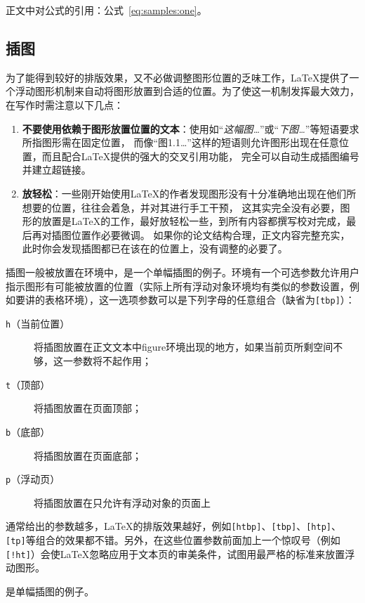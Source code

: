 正文中对公式的引用：公式~\eqref{eq:samples:one}。

\subsection{插图}
为了能得到较好的排版效果，又不必做调整图形位置的乏味工作，\LaTeX 提供了一个浮动图形机制来自动将图形放置到合适的位置。为了使这一机制发挥最大效力，在写作时需注意以下几点：
\begin{enumerate}
	\item \textbf{不要使用依赖于图形放置位置的文本}：使用如“\emph{这幅图…}”或“\emph{下图…}”等短语要求所指图形需在固定位置，
	      而像“{\kaishu 图1.1…}”这样的短语则允许图形出现在任意位置，而且配合\LaTeX 提供的强大的交叉引用功能，
	      完全可以自动生成插图编号并建立超链接。
	\item \textbf{放轻松}：一些刚开始使用\LaTeX 的作者发现图形没有十分准确地出现在他们所想要的位置，往往会着急，并对其进行手工干预，
	      这其实完全没有必要，图形的放置是\LaTeX 的工作，最好放轻松一些，到所有内容都撰写校对完成，最后再对插图位置作必要微调。
	      如果你的论文结构合理，正文内容完整充实，此时你会发现插图都已在该在的位置上，没有调整的必要了。
\end{enumerate}

插图一般被放置在环境中，是一个单幅插图的例子。环境有一个可选参数允许用户指示图形有可能被放置的位置（实际上所有浮动对象环境均有类似的参数设置，例如要讲的表格环境），这一选项参数可以是下列字母的任意组合（缺省为\texttt{[tbp]}）：
\begin{description}
	\item[\texttt{h}（当前位置）] 将插图放置在正文文本中figure环境出现的地方，如果当前页所剩空间不够，这一参数将不起作用；
	\item[\texttt{t}（顶部）] 将插图放置在页面顶部；
	\item[\texttt{b}（底部）] 将插图放置在页面底部；
	\item[\texttt{p}（浮动页）] 将插图放置在只允许有浮动对象的页面上
\end{description}

通常给出的参数越多，\LaTeX 的排版效果越好，例如\texttt{[htbp]}、\texttt{[tbp]}、\texttt{[htp]}、\texttt{[tp]}等组合的效果都不错。另外，在这些位置参数前面加上一个惊叹号（例如\texttt{[!ht]}）会使\LaTeX 忽略应用于文本页的审美条件，试图用最严格的标准来放置浮动图形。

是单幅插图的例子。

